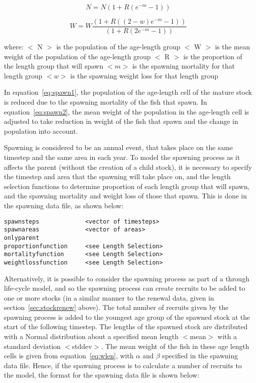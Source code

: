 \documentclass [a4paper, 10pt]{book}
\begin{document}
\begin{equation}\label{eq:spawn1}
N = N {\left(1 + R {(e^{-m} - 1)}\right)}
\end{equation}

\begin{equation}\label{eq:spawn2}
W = W \frac{\left(1 + R {((2 - w)e^{-m} - 1)}\right)}{\left(1 + R {(2e^{-m} - 1)}\right)}
\end{equation}

where:\newline
$<$ N $>$ is the population of the age-length group\newline
$<$ W $>$ is the mean weight of the population of the age-length group\newline
$<$ R $>$ is the proportion of the length group that will spawn\newline
$<m>$ is the spawning mortality for that length group\newline
$<w>$ is the spawning weight loss for that length group

\bigskip
In equation~\ref{eq:spawn1}, the population of the age-length cell of the mature stock is reduced due to the spawning mortality of the fish that spawn.  In equation~\ref{eq:spawn2}, the mean weight of the population in the age-length cell is adjusted to take reduction in weight of the fish that spawn and the change in population into account.

\bigskip
Spawning is considered to be an annual event, that takes place on the same timestep and the same area in each year.  To model the spawning process as it affects the parent (without the creation of a child stock), it is necessary to specify the timestep and area that the spawning will take place on, and the length selection functions to determine proportion of each length group that will spawn, and the spawning mortality and weight loss of those that spawn.  This is done in the spawning data file, as shown below:

{\small\begin{verbatim}
spawnsteps             <vector of timesteps>
spawnareas             <vector of areas>
onlyparent
proportionfunction     <see Length Selection>
mortalityfunction      <see Length Selection>
weightlossfunction     <see Length Selection>
\end{verbatim}}

Alternatively, it is possible to consider the spawning process as part of a through life-cycle model, and so the spawning process can create recruits to be added to one or more stocks (in a similar manner to the renewal data, given in section~\ref{sec:stockrenew} above).  The total number of recruits given by the spawning process is added to the youngest age group of the spawned stock at the start of the following timestep.  The lengths of the spawned stock are distributed with a Normal distribution about a specified mean length $<$mean$>$ with a standard deviation $<$stddev$>$.  The mean weight of the fish in these age length cells is given from equation~\ref{eq:wlen}, with $\alpha$ and $\beta$ specified in the spawning data file.  Hence, if the spawning process is to calculate a number of recruits to the model, the format for the spawning data file is shown below:
\end{document}
